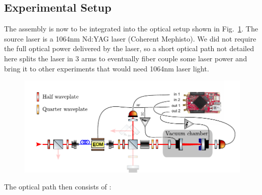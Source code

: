 \color{black}

\subsection{Experimental Setup}
The assembly is now to be integrated into the optical setup shown in Fig.~\ref{fig:optical layout}. The source laser is a 1064nm Nd:YAG laser (Coherent Mephisto). We did not require the full optical power delivered by the laser, so a short optical path not detailed here splits the laser in 3 arms to eventually fiber couple some laser power and bring it to other experiments that would need 1064nm laser light. \newline

\begin{figure}[h!]
    \centering  
    \includegraphics[width=\textwidth]{./chap5/fig/fig_lock_MATE.pdf}
    \caption{}
    \label{fig:optical layout}
\end{figure}
The optical path then consists of : 
